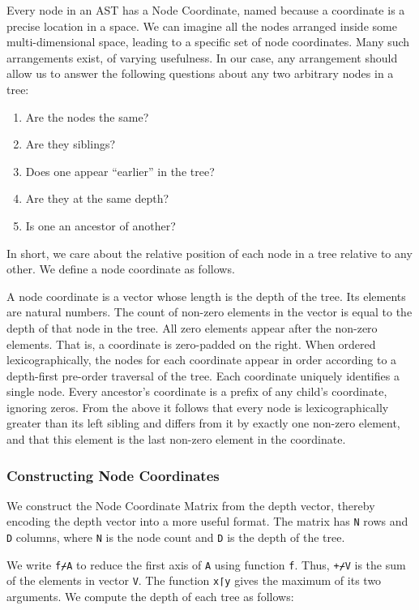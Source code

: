 ﻿\documentclass[numbers,10pt,preprint]{sigplanconf}
\begin{document}
Every node in an AST has a Node Coordinate, named because a coordinate is a precise location in a space.  We can imagine all the nodes arranged inside some multi-dimensional space, leading to a specific set of node coordinates. Many such arrangements exist, of varying usefulness. In our case, any arrangement should allow us to answer the following questions about any two arbitrary nodes in a tree:

\begin{enumerate}[noitemsep]
\item Are the nodes the same?
\item Are they siblings?
\item Does one appear ``earlier'' in the tree?
\item Are they at the same depth?
\item Is one an ancestor of another?
\end{enumerate}

\noindent In short, we care about the relative position of each node in a tree relative to any other. We define a node coordinate as follows.

A node coordinate is a vector whose length is the depth of the tree. Its elements are natural numbers.  The count of non-zero elements in the vector is equal to the depth of that node in the tree. All zero elements appear after the non-zero elements. That is, a coordinate is zero-padded on the right. When ordered lexicographically, the nodes for each coordinate appear in order according to a depth-first pre-order traversal of the tree. Each coordinate uniquely identifies a single node. Every ancestor’s coordinate is a prefix of any child’s coordinate, ignoring zeros. From the above it follows that every node is lexicographically greater than its left sibling and differs from it by exactly one non-zero element, and that this element is the last non-zero element in the coordinate.

\subsubsection{Constructing Node Coordinates}

We construct the Node Coordinate Matrix from the depth vector, thereby encoding the depth vector into a more useful format. The matrix has \verb;N; rows and \verb;D; columns, where \verb;N; is the node count and \verb;D; is the depth of the tree.

We write \verb;f⌿A; to reduce the first axis of \verb;A; using function \verb;f;. Thus, \verb;+⌿V; is the sum of the elements in vector \verb;V;. The function \verb;x⌈y; gives the maximum of its two arguments. We compute the depth of each tree as follows:
\end{document}
